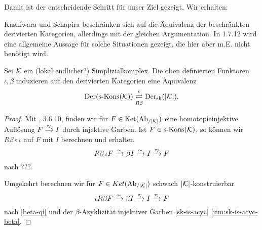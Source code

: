 Damit ist der entscheidende Schritt für unser Ziel gezeigt. Wir
erhalten:






\begin{bem}
  Kashiwara und Schapira beschränken sich auf die Äquivalenz der
  beschränkten derivierten Kategorien, allerdings mit der gleichen
  Argumentation. In \cite{KS} 1.7.12 wird eine allgemeine Aussage für
  solche Situationen gezeigt, die hier aber m.E. nicht benötigt wird.
\end{bem}

\begin{theorem}
  Sei $\mathcal{K}$ ein (lokal endlicher?) Simplizialkomplex. Die oben definierten
  Funktoren $\iota, \beta$ induzieren auf den derivierten Kategorien
  eine Äquivalenz  
  \[ \operatorname{Der}(\operatorname{s-Kons}(\mathcal{K}))
  \mathrel{\mathop{\rightleftarrows}^{\iota}_{R \beta}}
  \operatorname{Der}_{\mathrm{sk}}(|\mathcal{K}|). \]
\end{theorem}
\begin{proof}
  Mit \cite{TD}, 3.6.10, finden wir für $F \in \operatorname{Ket}(\operatorname{Ab}_{/|\mathcal{K}|})$ eine
  homotopieinjektive Auflösung $F \xrightarrow{\approx} I$ durch injektive Garben. Ist
  $F \in \operatorname{s-Kons}(\mathcal{K})$, so können wir $R\beta \circ \iota$ auf $F$ mit
  $I$ berechnen und erhalten
  \[ R\beta \, \iota F \xrightarrow{\sim} \beta I \xrightarrow{\sim} I \xrightarrow{\approx} F \]
  nach ???.


  Umgekehrt berechnen wir für $F \in Ket(\operatorname{Ab}_{/|\mathcal{K}|})$ schwach
  $|\mathcal{K}|$-konstruierbar
  \[ \iota R\beta F \xrightarrow{\sim} \beta I \xrightarrow{\approx} I \xrightarrow{\approx} F \]
  nach \ref{beta-qi} und der $\beta$-Azyklizität injektiver Garben
  \ref{sk-is-acyc} \ref{itm:sk-is-acyc-beta}.
\end{proof}



